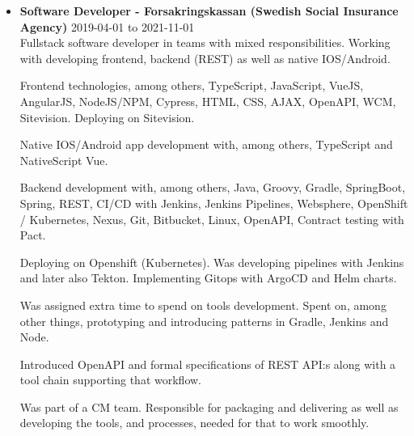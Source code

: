 \documentclass[a4paper]{article}
\begin{document}
\begin{itemize}
  \item \textbf{Software Developer - Forsakringskassan (Swedish Social Insurance Agency)} 2019-04-01 to 2021-11-01 \\

  Fullstack software developer in teams with mixed responsibilities. Working with developing frontend, backend (REST) as well as native IOS/Android.

  Frontend technologies, among others, TypeScript, JavaScript, VueJS, AngularJS, NodeJS/NPM, Cypress, HTML, CSS, AJAX, OpenAPI, WCM, Sitevision. Deploying on Sitevision.

  Native IOS/Android app development with, among others, TypeScript and NativeScript Vue.
  
  Backend development with, among others, Java, Groovy, Gradle, SpringBoot, Spring, REST, CI/CD with Jenkins, Jenkins Pipelines, Websphere, OpenShift / Kubernetes, Nexus, Git, Bitbucket, Linux, OpenAPI, Contract testing with Pact.

  Deploying on Openshift (Kubernetes). Was developing pipelines with Jenkins and later also Tekton. Implementing Gitops with ArgoCD and Helm charts.

  Was assigned extra time to spend on tools development. Spent on, among other things, prototyping and introducing patterns in Gradle, Jenkins and Node.
  
  Introduced OpenAPI and formal specifications of REST API:s along with a tool chain supporting that workflow.
  
  Was part of a CM team. Responsible for packaging and delivering as well as developing the tools, and processes, needed for that to work smoothly.
\end{itemize}
  
\end{document}
